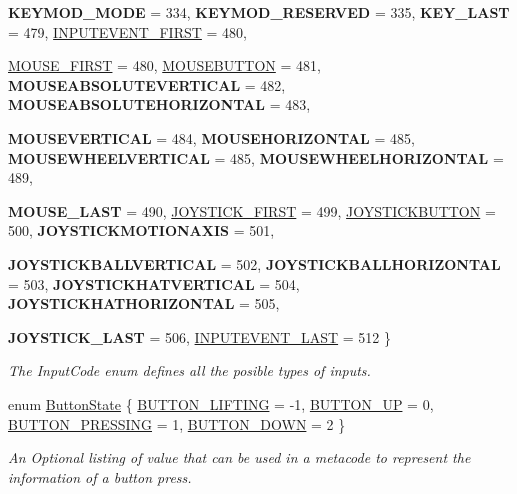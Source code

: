 \begin{DoxyCompactItemize}
{\bfseries KEYMOD\_\-MODE} =  334, 
{\bfseries KEYMOD\_\-RESERVED} =  335, 
{\bfseries KEY\_\-LAST} =  479, 
\hyperlink{classMetaCode_a7390e6f58e25c0ce377bba4e63081b24aa27e8c7d5dc3cc1d726ae82aef44d21c}{INPUTEVENT\_\-FIRST} =  480, 
\par
\hyperlink{classMetaCode_a7390e6f58e25c0ce377bba4e63081b24a98454cf025e1b11ac8978c4b493582c4}{MOUSE\_\-FIRST} =  480, 
\hyperlink{classMetaCode_a7390e6f58e25c0ce377bba4e63081b24a90e6bf109b0decae5cc828ebc5934dfa}{MOUSEBUTTON} =  481, 
{\bfseries MOUSEABSOLUTEVERTICAL} =  482, 
{\bfseries MOUSEABSOLUTEHORIZONTAL} =  483, 
\par
{\bfseries MOUSEVERTICAL} =  484, 
{\bfseries MOUSEHORIZONTAL} =  485, 
{\bfseries MOUSEWHEELVERTICAL} =  485, 
{\bfseries MOUSEWHEELHORIZONTAL} =  489, 
\par
{\bfseries MOUSE\_\-LAST} =  490, 
\hyperlink{classMetaCode_a7390e6f58e25c0ce377bba4e63081b24aa3222db6ab303f525a1a0c87603d806c}{JOYSTICK\_\-FIRST} =  499, 
\hyperlink{classMetaCode_a7390e6f58e25c0ce377bba4e63081b24ab52ae2c161faf882271ec71ded86501f}{JOYSTICKBUTTON} =  500, 
{\bfseries JOYSTICKMOTIONAXIS} =  501, 
\par
{\bfseries JOYSTICKBALLVERTICAL} =  502, 
{\bfseries JOYSTICKBALLHORIZONTAL} =  503, 
{\bfseries JOYSTICKHATVERTICAL} =  504, 
{\bfseries JOYSTICKHATHORIZONTAL} =  505, 
\par
{\bfseries JOYSTICK\_\-LAST} =  506, 
\hyperlink{classMetaCode_a7390e6f58e25c0ce377bba4e63081b24ad1ca5de26bcaae04a631fdaa13e5749f}{INPUTEVENT\_\-LAST} =  512
 \}
\begin{DoxyCompactList}\small\item\em The InputCode enum defines all the posible types of inputs. \item\end{DoxyCompactList}\item 
enum \hyperlink{classMetaCode_a8bcce67af20f4f779ba6f5387e438077}{ButtonState} \{ \hyperlink{classMetaCode_a8bcce67af20f4f779ba6f5387e438077aa16bc921174974d9e30752eff7af8336}{BUTTON\_\-LIFTING} =  -\/1, 
\hyperlink{classMetaCode_a8bcce67af20f4f779ba6f5387e438077a87e2c9bdb3c969158f85543759dce244}{BUTTON\_\-UP} =  0, 
\hyperlink{classMetaCode_a8bcce67af20f4f779ba6f5387e438077a1113791ce46932b93099ba765116b0d7}{BUTTON\_\-PRESSING} =  1, 
\hyperlink{classMetaCode_a8bcce67af20f4f779ba6f5387e438077a73ef49474af25ad4c503fe27420c6448}{BUTTON\_\-DOWN} =  2
 \}
\begin{DoxyCompactList}\small\item\em An Optional listing of value that can be used in a metacode to represent the information of a button press. \item\end{DoxyCompactList}\item 

\end{DoxyCompactItemize}
